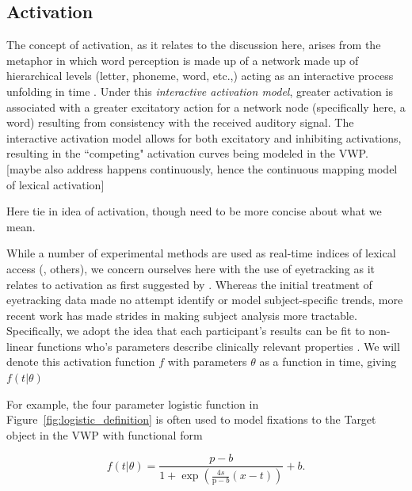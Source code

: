 \subsection{Activation}

The concept of activation, as it relates to the discussion here, arises from the metaphor in which word perception is made up of a network made up of hierarchical levels (letter, phoneme, word, etc.,) acting as an interactive process unfolding in time \cite{McClelland1981}. Under this \textit{interactive activation model}, greater activation is associated with a greater excitatory action for a network node (specifically here, a word) resulting from consistency with the received auditory signal. The interactive activation model allows for both excitatory and inhibiting activations, resulting in the ``competing" activation curves being modeled in the VWP. [maybe also address happens continuously, hence the continuous mapping model of lexical activation]

Here tie in idea of activation, though need to be more concise about what we mean. 

While a number of experimental methods are used as real-time indices of lexical access (\cite{Spivey2005}, others), we concern ourselves here with the use of eyetracking as it relates to activation as first suggested by \cite{allopenna1998tracking}. Whereas the initial treatment of eyetracking data made no attempt identify or model subject-specific trends, more recent work has made strides in making subject analysis more tractable. Specifically, we adopt the idea that each participant's results can be fit to non-linear functions who's parameters describe clinically relevant properties \cite{mcmurray2010individual}. We will denote this activation function $f$ with parameters $\theta$ as a function in time, giving $f(t|\theta)$

For example, the four parameter logistic function in Figure~\ref{fig:logistic_definition} is often used to model fixations to the Target object in the VWP with functional form

\begin{equation} \label{eq:logistic}
f(t|\theta) = \frac{p-b}{1 + \exp \left(\frac{4s}{\text{p}-b} (x - t) \right)} + b.
\end{equation}

